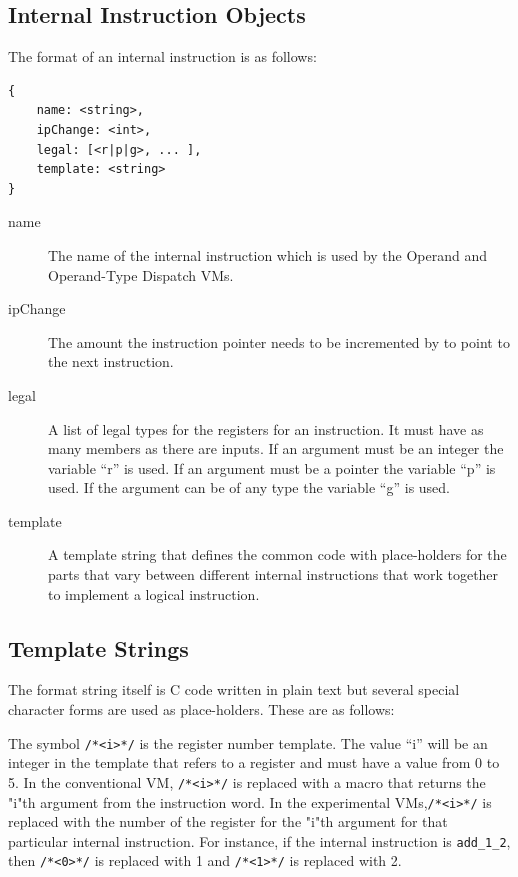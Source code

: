 \documentclass[english,a4paper,12pt]{report}
\begin{document}
\subsection{Internal Instruction Objects}

The format of an internal instruction is as follows:
\begin{lstlisting}
{
    name: <string>,
    ipChange: <int>,
    legal: [<r|p|g>, ... ],
    template: <string>
}
\end{lstlisting}

\begin{description}
\item[name] The name of the internal instruction which is used by the
  Operand and Operand-Type Dispatch VMs.
\item[ipChange] The amount the instruction pointer needs to be
  incremented by to point to the next instruction.
\item[legal] A list of legal types for the registers for an
  instruction. It must have as many members as there are inputs. If an
  argument must be an integer the variable ``r'' is used. If an
  argument must be a pointer the variable ``p'' is used. If the
  argument can be of any type the variable ``g'' is used.
\item[template] A template string that defines the common code with
  place-holders for the parts that vary between different internal
  instructions that work together to implement a logical instruction.
\end{description}

\subsection{Template Strings}

The format string itself is C code written in plain text but several
special character forms are used as place-holders. These are as
follows:

The symbol \verb|/*<i>*/| is the register number template. The value
``i'' will be an integer in the template that refers to a register and
must have a value from 0 to 5. In the conventional VM, \verb|/*<i>*/|
is replaced with a macro that returns the "i"th argument from the
instruction word. In the experimental VMs,\verb|/*<i>*/| is replaced
with the number of the register for the "i"th argument for that
particular internal instruction.  For instance, if the internal
instruction is \verb|add_1_2|, then \verb|/*<0>*/| is replaced with 1
and \verb|/*<1>*/| is replaced with 2.
\end{document}
